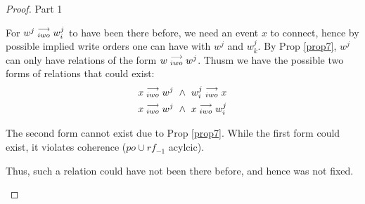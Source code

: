 \begin{proof}{Part 1}
\begin{itemize}
                        For $w^j\stackrel{\longrightarrow}{_{iwo}}w_i^j$ to have been there before, we need an event $x$ to connect, hence by possible implied  write    orders one can have with $w^j$ and $w_k^j$. By Prop \ref{prop7}, $w^j$ can only have relations of the form  $w\stackrel{\longrightarrow}{_{iwo}}w^j$. Thusm we have the possible two forms of relations that could exist:
                        \begin{align*}
                            \reln{x}{iwo}{w^j} \ \wedge \ \reln{w_i^j}{iwo}{x} \\
                            \reln{x}{iwo}{w^j} \ \wedge \ \reln{x}{iwo}{w_i^j} \\ 
                        \end{align*}

                        The second form cannot exist due to Prop \ref{prop7}. While the first form could exist, it violates coherence ($po  \cup rf_ {-1}$ acylcic). 

                        Thus, such a relation could have not been there before, and hence was not fixed. 

                \end{itemize}
            
        \end{proof}

